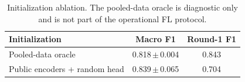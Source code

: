 \begin{table}[t]
\caption{Initialization ablation. The pooled-data oracle is diagnostic
only and is not part of the operational FL protocol.}
\label{tab:warmstart}
\centering\footnotesize
\begin{tabular}{lcc}
\toprule
Initialization & Macro F1 & Round-1 F1\\
\midrule
Pooled-data oracle & 0.818\,$\pm$\,0.004 & 0.843 \\
Public encoders + random head & 0.839\,$\pm$\,0.065 & 0.704 \\
\bottomrule
\end{tabular}
\end{table}
